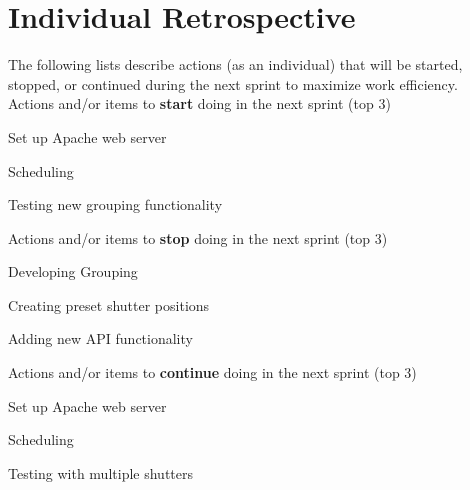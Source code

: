 \documentclass{article}
\begin{document}
\pagebreak

\section{Individual Retrospective}
The following lists describe actions (as an individual) that will be started, stopped, or continued during the next sprint to maximize work efficiency. \\

Actions and/or items to \textbf{start} doing in the next sprint (top 3)
\begin{itemize}
\begin{item}
Set up Apache web server
\end{item}
\begin{item}
Scheduling
\end{item}
\begin{item}
Testing new grouping functionality
\end{item}
\end{itemize}

Actions and/or items to \textbf{stop} doing in the next sprint (top 3)
\begin{itemize}
\begin{item}
Developing Grouping 
\end{item}
\begin{item}
Creating preset shutter positions
\end{item}
\begin{item}
Adding new API functionality
\end{item}
\end{itemize}

Actions and/or items to \textbf{continue} doing in the next sprint (top 3)
\begin{itemize}
\begin{item}
Set up Apache web server
\end{item}
\begin{item}
Scheduling
\end{item}
\begin{item}
Testing with multiple shutters
\end{item}
\end{itemize}
\end{document}
